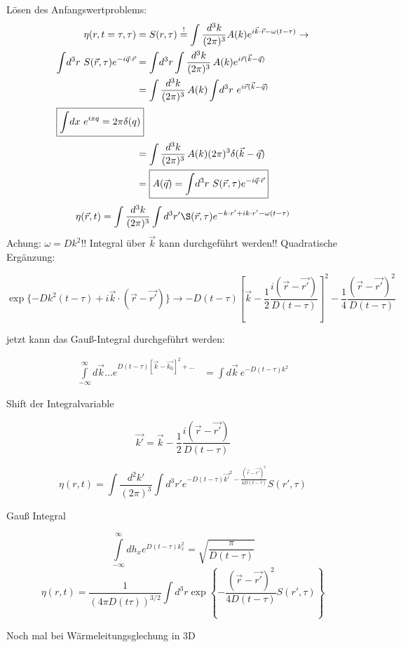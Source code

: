 \documentclass[a4paper,ngerman]{scrbook}
\begin{document}
Lösen des Anfangswertproblems:
\begin{align*}
\eta(r,t=\tau,\tau) &= S(r,\tau) \overset{!}{=} \int\frac{d^3k}{(2\pi)^3}A(k) e^{i\vec{k}\cdot\vec{r} - \omega(t-\tau)} \to\\
\int\! d^3r\ S(\vec{r}, \tau) e^{-i\vec{q}\cdot\vec{r}} &= \int\! d^3r \int \frac{d^3k}{(2\pi)^3}\, A(k) e^{i\vec{r}(\vec{k}-\vec{q})}\\
&= \int\frac{d^3k}{(2\pi)^3}\, A(k) \int\!  d^3r\ e^{i\vec{r}(\vec{k}-\vec{q})}\\
\intertext{$\boxed{\int\! dx\ e^{ixq} = 2\pi\delta(q)}$}
&= \int\frac{d^3k}{(2\pi)^3}\, A(k) (2\pi)^3 \delta(\vec{k} - \vec{q})\\
&= \boxed{A(\vec{q}) = \int\! d^3r\ S(\vec{r}, \tau) e^{-i\vec{q}\cdot\vec{r}}}
\end{align*}
\begin{align*}
  \eta(\vec{r}, t) = \int\frac{d^3k}{(2\pi)^3}\int d^3r'\S(\vec{r},\tau) e^{-k\cdot r' + ik\cdot r' - \omega(t-\tau)}
\end{align*}
Achung: $\omega = Dk^2$!! Integral über $\vec{k}$ kann durchgeführt werden!! Quadratische Ergänzung:

\[
\exp\{ -Dk^2(t-\tau) + i\vec{k}\cdot(\vec{r} - \vec{r'}) \} \to -D(t-\tau)\left[ \vec{k} - \frac{1}{2}\frac{i(\vec{r}-\vec{r'})}{D(t-\tau)} \right]^2 - \frac{1}{4}\frac{(\vec{r}-\vec{r'})^2}{D(t-\tau)}
\]

jetzt kann das Gauß-Integral durchgeführt werden:

\begin{align*}
  \int\limits_{-\infty}^\infty \! d\vec{k}\dots e ^{D(t-\tau)[\vec{k}-\vec{k_0}]^2+\dots} &= \int\! d\vec{k}\ e^{-D(t-\tau)k^2}
\end{align*}

Shift der Integralvariable

\[
\vec{k'} = \vec{k} - \frac{1}{2} \frac{i(\vec{r}-\vec{r'})}{D(t-\tau)}
\]

\[
\eta(r,t) = \int \frac{d^2k'}{(2\pi)^3} \int d^3r' e^{-D(t-\tau)\vec{k'}^2 - \frac{(\vec{r} - \vec{r'})^2}{4D(t-\tau)}} S(r',\tau)
\]

Gauß Integral

\[
\int\limits_{-\infty}^\infty\! dh_x e^{D(t-\tau)k_x^2} = \sqrt{\frac{\pi}{D(t-\tau)}}
\]
\[
\eta(r,t) = \frac{1}{(4\pi D(t\tau))^{3/2}} \int\! d^3r \exp\left\{ -\frac{(\vec{r} - \vec{r'})^2}{4D(t-\tau)} S(r',\tau)\right\}
\]

Noch mal bei Wärmeleitungsglechung in 3D
\end{document}
